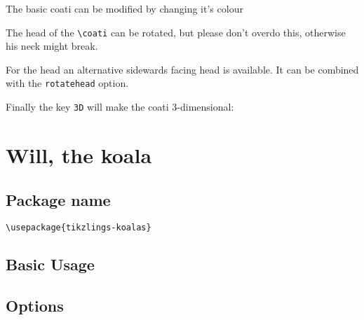\documentclass[parskip=half]{scrartcl}
\begin{document}
The basic coati can be modified by changing it's colour
\begin{tcblisting}{}
\coati[body=SteelBlue]
\end{tcblisting}

The head of the \lstinline|\coati| can be rotated, but please don't overdo this, otherwise his neck might break.
\begin{tcblisting}{}
\coati[rotatehead=-15]
\end{tcblisting}

For the head an alternative sidewards facing head is available. It can be combined with the \lstinline|rotatehead| option.
\begin{tcblisting}{}
\coati[sideward]
\end{tcblisting}

Finally the key \lstinline|3D| will make the coati 3-dimensional:
\begin{tcblisting}{}
\coati[3D]
\end{tcblisting}


\clearpage
\section[Koala]{Will, the koala}

\subsection{Package name}

\begin{tcolorbox}[lower separated=false, lefthand width=.8\linewidth]
\vspace*{0.5cm}
\lstinline|\usepackage{tikzlings-koalas}|
\vspace*{0.5cm}
\end{tcolorbox}

\subsection{Basic Usage}

\begin{tcblisting}{}
\koala
\end{tcblisting}

\subsection{Options}
\end{document}
